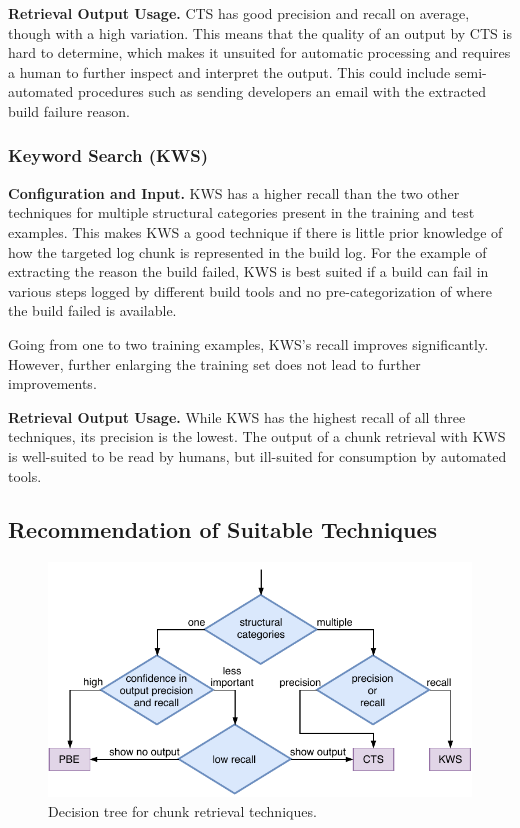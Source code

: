 \noindent
\textbf{Retrieval Output Usage.}
CTS has good precision and recall on average, though with a high
variation.
This means that the quality of an output by CTS is hard to
determine, which makes it unsuited for automatic processing and requires
a human to further inspect and interpret the output.
This could include semi-automated procedures such as sending
developers an email with the extracted build failure reason.

\subsubsection{Keyword Search (KWS)}
\noindent
\textbf{Configuration and Input.}
KWS has a higher recall than the two other techniques for multiple
structural categories present in the training and test examples.
This
makes KWS a good technique if there is little prior knowledge of how
the targeted log chunk is represented in the build log.
For the
example of extracting the reason the build failed, KWS is best suited
if a build can fail in various steps logged by different build
tools and no
pre-categorization of where the build failed is available.

Going from one to two training examples, KWS's recall improves
significantly.
However, further enlarging the training set
does not lead to further improvements.

\noindent
\textbf{Retrieval Output Usage.}
While KWS has the highest recall of all three techniques, its
precision is the lowest.
The output of a chunk retrieval with KWS is
well-suited to be read by humans, but ill-suited for consumption by
automated tools.


\subsection{Recommendation of Suitable Techniques}

\begin{figure}[bt]
		\centering
		\includegraphics[width=\columnwidth,
		clip]{img/crt-recommendation.pdf}
		\caption{Decision tree for chunk
		retrieval techniques.}
		\label{fig:crt-recommendation}
\end{figure}

